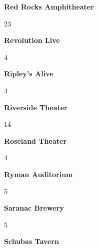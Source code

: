 \newline 
\begin{center}\textbf{Red Rocks Amphitheater}\end{center}
\begin{center}23\end{center} 
\newline 
\begin{center}\textbf{Revolution Live}\end{center}
\begin{center}4\end{center} 
\newline 
\begin{center}\textbf{Ripley's Alive}\end{center}
\begin{center}4\end{center} 
\newline 
\begin{center}\textbf{Riverside Theater}\end{center}
\begin{center}14\end{center} 
\newline 
\begin{center}\textbf{Roseland Theater}\end{center}
\begin{center}4\end{center} 
\newline 
\begin{center}\textbf{Ryman Auditorium}\end{center}
\begin{center}5\end{center} 
\newline 
\begin{center}\textbf{Saranac Brewery}\end{center}
\begin{center}5\end{center} 
\newline 
\begin{center}\textbf{Schubas Tavern}\end{center}
